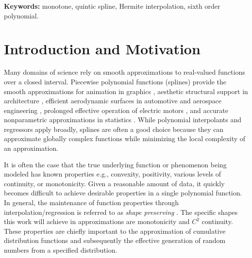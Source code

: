 \documentclass{scspaperproc}
\theoremstyle{scsthe}
\begin{document}
\textbf{Keywords:} monotone, quintic spline, Hermite interpolation, sixth order polynomial.


\section{Introduction and Motivation}
\label{sec:introduction}





Many domains of science rely on smooth approximations to real-valued functions over a closed interval. Piecewise polynomial functions (splines) provide the smooth approximations for animation in graphics \cite{herman2015techniques,quint2003scalable}, aesthetic structural support in architecture \cite{brennan2019measure}, efficient aerodynamic surfaces in automotive and aerospace engineering \cite{brennan2019measure}, prolonged effective operation of electric motors , and accurate nonparametric approximations in statistics \cite{knott2012interpolating}. While polynomial interpolants and regressors apply broadly, splines are often a good choice because they can approximate globally complex functions while minimizing the local complexity of an approximation.

It is often the case that the true underlying function or phenomenon being modeled has known properties e.g., convexity, positivity, various levels of continuity, or monotonicity. Given a reasonable amount of data, it quickly becomes difficult to achieve desirable properties in a single polynomial function. In general, the maintenance of function properties through interpolation/regression is referred to as \textit{shape preserving} \cite{fritsch1980monotone,gregory1985shape}. The specific shapes this work will achieve in approximations are monotonicity and $C^2$ continuity. These properties are chiefly important to the approximation of cumulative distribution functions and subsequently the effective generation of random numbers from a specified distribution.
\end{document}
